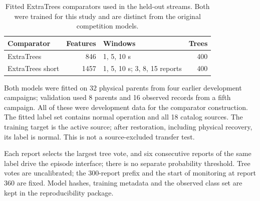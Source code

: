 \begin{table}[t]\centering\small
\caption{Fitted ExtraTrees comparators used in the held-out streams. Both were trained for this study and are distinct from the original competition models.}
\label{tab:comparator-lineage}
\begin{tabular}{@{}lrlr@{}}\toprule
Comparator & Features & Windows & Trees\\\midrule
ExtraTrees & 846 & 1, 5, 10 s & 400\\
ExtraTrees short & 1457 & 1, 5, 10 s; 3, 8, 15 reports & 400\\
\bottomrule\end{tabular}
\end{table}

Both models were fitted on 32 physical parents from four
earlier development campaigns; validation used
8 parents and 16 observed records from a fifth campaign.
All of these were development data for the comparator construction.
The fitted label set contains normal operation and all 18 catalog
sources. The training target is the active source; after restoration,
including physical recovery, its label is normal. This is not a
source-excluded transfer test.

Each report selects the largest tree vote, and six consecutive
reports of the same label drive the episode interface; there is no
separate probability threshold. Tree votes are uncalibrated; the
300-report prefix and the start of monitoring at report 360 are fixed.
Model hashes, training metadata and the observed class set are kept
in the reproducibility package.
